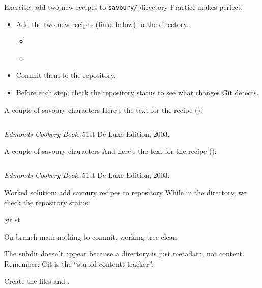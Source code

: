 \documentclass{git_course}
\begin{document}
\begin{frame}[fragile]{Exercise: add two new recipes to \texttt{savoury/} directory}
    Practice makes perfect:
    \begin{itemize}
        \item Add the two new recipes (links below) to the  directory.
            \begin{itemize}
                \item \href{https://raw.githubusercontent.com/paultcochrane/git_course/refs/heads/master/git/examples/cheese-scones.md}{}
                \item \href{https://raw.githubusercontent.com/paultcochrane/git_course/refs/heads/master/git/examples/bacon-and-egg-pie.md}{}
            \end{itemize}
        \item Commit them to the repository.
        \item Before each step, check the repository status to see what
            changes Git detects.
    \end{itemize}
\end{frame}

\begin{frame}[fragile]{A couple of savoury characters}
    Here's the text for the  recipe
    (\href{https://raw.githubusercontent.com/paultcochrane/git_course/refs/heads/master/git/examples/cheese-scones.md}{}):

    \inputminted[fontsize=\tiny]{markdown}{examples/cheese-scones.md}
    {\footnotesize \emph{Edmonds Cookery Book}, 51st De Luxe Edition, 2003.}
\end{frame}

\begin{frame}[fragile]{A couple of savoury characters}
    And here's the text for the  recipe
    (\href{https://raw.githubusercontent.com/paultcochrane/git_course/refs/heads/master/git/examples/bacon-and-egg-pie.md}{}):

    \inputminted[fontsize=\tiny]{markdown}{examples/bacon-and-egg-pie.md}
    {\footnotesize \emph{Edmonds Cookery Book}, 51st De Luxe Edition, 2003.}
\end{frame}

\begin{frame}[fragile]{Worked solution: add savoury recipes to repository}
    While in the  directory, we check the repository status:
    \begin{shellcode}
        git st
    \end{shellcode}
    \begin{outputcode}
On branch main
nothing to commit, working tree clean
    \end{outputcode}
    The  subdir doesn't appear because a directory is just
    metadata, not content.  Remember: Git is the ``stupid contentt tracker''.

    Create the files  and
    .
\end{frame}
\end{document}
